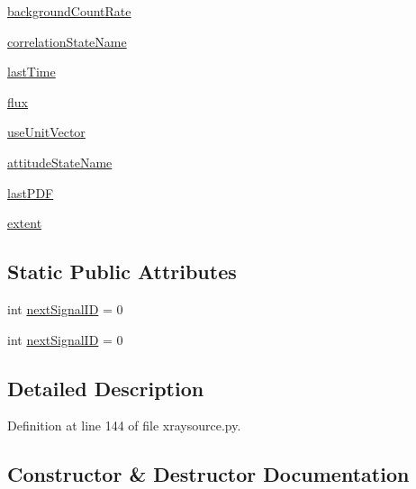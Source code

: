 \begin{DoxyCompactItemize}
\item 
\hyperlink{classmodest_1_1signals_1_1xraysource_1_1PeriodicXRaySource_a3a04d3f0609b7454efc4ef9cdcd7b219}{background\+Count\+Rate}
\item 
\hyperlink{classmodest_1_1signals_1_1poissonsource_1_1DynamicPoissonSource_ac7f62303bb8a417a1ddefb032c707bcd}{correlation\+State\+Name}
\item 
\hyperlink{classmodest_1_1signals_1_1poissonsource_1_1PoissonSource_a34395fc83bd8743a0a5ee69f9392a606}{last\+Time}
\item 
\hyperlink{classmodest_1_1signals_1_1poissonsource_1_1PoissonSource_a6f2c657ad936b921715d826ac74f7fe5}{flux}
\item 
\hyperlink{classmodest_1_1signals_1_1pointsource_1_1PointSource_ac2dd52c4e1f7e6264c9d59a5ffbc43d1}{use\+Unit\+Vector}
\item 
\hyperlink{classmodest_1_1signals_1_1pointsource_1_1PointSource_a0924a2233bb4fd23e50d024e4f1b048e}{attitude\+State\+Name}
\item 
\hyperlink{classmodest_1_1signals_1_1pointsource_1_1PointSource_afde4a069238f53aaa11fbc54584b7a64}{last\+P\+DF}
\item 
\hyperlink{classmodest_1_1signals_1_1pointsource_1_1PointSource_a984b5a75c9e94cb3527707b9ac976f9e}{extent}
\end{DoxyCompactItemize}
\subsection*{Static Public Attributes}
\begin{DoxyCompactItemize}
\item 
int \hyperlink{classmodest_1_1signals_1_1signalsource_1_1SignalSource_a453eafb550b551adbec0903deb63dfce}{next\+Signal\+ID} = 0
\item 
int \hyperlink{classmodest_1_1signals_1_1signalsource_1_1SignalSource_a453eafb550b551adbec0903deb63dfce}{next\+Signal\+ID} = 0
\end{DoxyCompactItemize}


\subsection{Detailed Description}


Definition at line 144 of file xraysource.\+py.



\subsection{Constructor \& Destructor Documentation}
